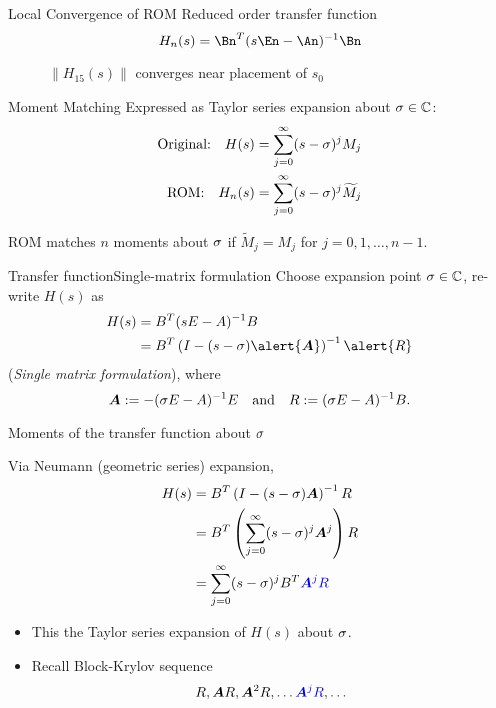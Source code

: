 \documentclass{beamer}
\newcommand{\Balert}[1]{\textcolor{blue}{#1}}
\begin{document}
\begin{frame}{Local Convergence of ROM}
    Reduced order transfer function 
 	 \[
		H_n(s) =  \Bn^T(s\En-\An)^{-1}\Bn 
 	\]
 	\begin{figure}
	     \centering
	     	\caption{$\|H_{15}(s)\|$ converges near placement of $s_0$}
     \end{figure}
 \end{frame}
 


\begin{frame}{Moment Matching}
 	Expressed as Taylor series expansion about $\sigma\in\mathbb{C}$:
 	\begin{align*}
 		\text{Original:}\quad H(s) &= \sum_{j=0}^\infty (s-\xp )^jM_j \\
		\medskip
 		\text{ROM:}\quad H_n(s) &= \sum_{j=0}^\infty (s-\xp )^j\widetilde{M}_j\\
 	\end{align*}

 ROM matches $n$ moments about $\sigma$ if
 $\widetilde{M}_j=M_j$ for $j=0,1,\ldots,n-1$.

\end{frame}






\begin{frame}{Transfer function}{Single-matrix formulation}
Choose expansion point $\sigma\in\mathbb{C}$, re-write $H(s)$ as  
	\begin{align*}
			H(s) &= B^T(sE-A)^{-1}B\\
				&= B^T\left(I-(s-\xp)\alert{\A}\right)^{-1}\alert{R} 
	\end{align*}
(\alert{\emph{Single matrix formulation}}), where 
\[ \bm{A} := -(\sigma E-A)^{-1}E\quad\text{and}\quad R := (\sigma E-A)^{-1}B. \]
\end{frame}




\begin{frame}{Moments of the transfer function about $\sigma $}%
 
  Via Neumann (geometric series) expansion, 
  		\begin{align*}
  			H(s) &= B^T\left(I-(s-\xp )\A\right)^{-1}R \\
  				 &= B^T\left(\sum_{j=0}^\infty (s-\xp)^j\A^j\right)R\\
  				 &= \sum_{j=0}^\infty (s-\xp)^j B^T\Balert{\A^j R}
  		\end{align*}     		
  \begin{itemize}
  		\item This the Taylor series expansion of $H(s)$ about $\sigma$.
  		\item Recall Block-Krylov sequence
  		      \[ R,\A R,\A^2R,\ldots \Balert{\A^j R},\ldots\]
  \end{itemize}   
\end{frame}
 
\end{document}
